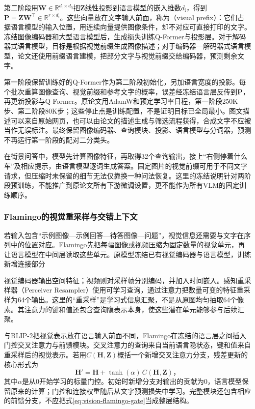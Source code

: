 第二阶段用$\bm W\in\mathbb R^{d_{\mathrm l}\times d_{\mathrm q}}$把$\bm Z$线性投影到语言模型的嵌入维数$d_{\mathrm l}$，得到$\bm P=\bm Z\bm W^\top\in\mathbb R^{r\times d_{\mathrm l}}$。这些向量放在文字输入前面，称为（visual prefix）：它们占据语言模型的输入位置，用连续向量提供图像条件，却不对应可直接打印的文字。冻结图像编码器和大型语言模型后，生成损失训练Q-Former与投影层。对于解码器式语言模型，目标是根据视觉前缀生成图像描述；对于编码器—解码器式语言模型，论文还使用前缀语言建模，把部分文字与视觉前缀交给编码器，预测剩余文字。

第一阶段保留训练好的Q-Former作为第二阶段初始化，另加语言宽度的投影。每个批次重算图像查询、视觉前缀和参考文字的概率，误差经冻结语言层反传到$\bm P$，再更新投影与Q-Former。原论文用AdamW和预定学习率日程，第一阶段250K步、第二阶段80K步；这些停止点是训练配置，不是证明目标已全局最小。图文描述可以来自原始网页，也可以由论文的描述生成与筛选流程获得，合成文字不应被当作无误标注。最终保留图像编码器、查询模块、投影、语言模型与分词器，预测不再运行第一阶段的配对二分类头。

在街景问答中，模型先计算图像特征，再取得32个查询输出，接上“右侧停着什么车”及相应提示，由语言模型逐词生成答案。固定图片的视觉前缀可用于不同文字请求，但压缩时未保留的细节无法仅靠换一种问法恢复。这里的冻结说明针对两阶段预训练，不能推广到原论文所有下游微调设置，更不能作为所有VLM的固定训练顺序。

\subsubsection{Flamingo的视觉重采样与交错上下文}
\label{sec:vision-models-flamingo}

若输入包含“示例图像—示例回答—待答图像—问题”，视觉信息还需要与文字在序列中的位置对应。Flamingo先把每幅图像或视频压缩为固定数量的视觉单元，再让语言模型在中间层读取这些单元。原模型冻结已有视觉编码器与语言模型，训练新增连接部分

视觉编码器输出空间特征；视频则对采样帧分别编码，并加入时间嵌入。感知重采样器（Perceiver Resampler）使用可学习查询，通过注意力把数量可变的特征重采样为64个输出。这里的“重采样”是学习式信息汇聚，不是从原图均匀抽取64个像素。其注意力的键和值还包含查询隐表示本身，使这些潜在单元能够参与后续汇聚。

与BLIP-2把视觉表示放在语言输入前面不同，Flamingo在冻结的语言层之间插入门控交叉注意力与前馈模块。交叉注意力的查询来自当前语言隐状态，键和值来自重采样后的视觉表示。若用$C(\bm H,\bm Z)$概括一个新增交叉注意力分支，残差更新的核心形式为
\begin{equation}
  \bm H'=\bm H+\tanh(\alpha)\,C(\bm H,\bm Z)\text{，}
  \label{eq:vision-flamingo-gate}
\end{equation}
其中$\alpha$是从0开始学习的标量门控。初始时新增分支对输出的贡献为0，语言模型保留原来的计算；门控和连接权重随后从文字预测损失中学习。完整模块还包含相应的前馈分支，不应把式\eqref{eq:vision-flamingo-gate}当成整层结构。

